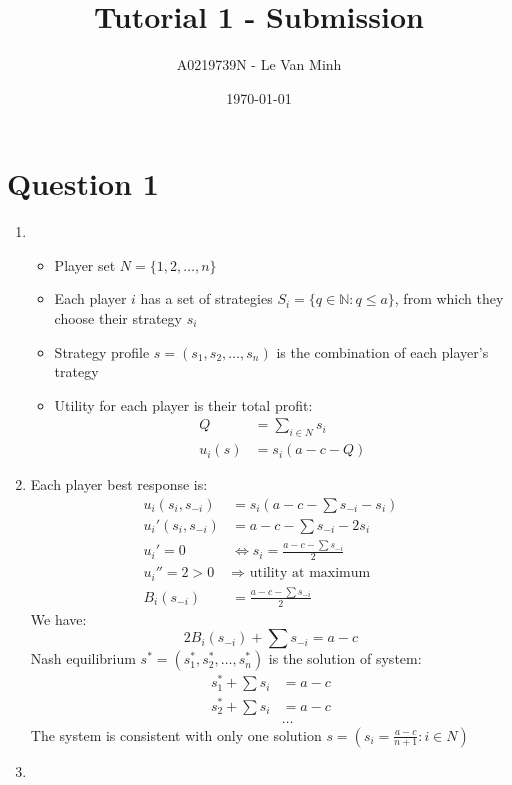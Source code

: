 \documentclass{article}
\title{Tutorial 1 - Submission}
\author{A0219739N - Le Van Minh}
\date{\today}
\begin{document}
\maketitle
\section*{Question 1} 
\begin{enumerate}
  \item \begin{itemize}
    \item Player set $N = \{1, 2, \dots, n\}$
    \item Each player $i$ has a set of strategies $S_i = \{q \in \mathbb{N}: q \le a\}$, from which they choose their strategy $s_i$
    \item Strategy profile $s = (s_1, s_2, \dots, s_n)$ is the combination of each player's trategy
    \item Utility for each player is their total profit:
      \begin{align*}
        Q &= \sum_{i \in N} s_i \\
        u_{i}(s) &= s_i (a - c - Q)
      \end{align*}
  \end{itemize}
  \item Each player best response is:
    \begin{align*}
      u_i(s_i, s_{-i}) &= s_i (a - c - \sum s_{-i} - s_i) \\
      u_i'(s_i, s_{-i}) &= a - c - \sum s_{-i} - 2s_i \\
      u_i' = 0 &\Leftrightarrow s_i = \frac{a - c - \sum s_{-i}}{2} \\
      u_i'' = 2 > 0 &\Rightarrow \text{ utility at maximum} \\
      B_i(s_{-i}) &= \frac{a - c - \sum s_{-i}}{2}
    \end{align*}
    We have: 
    \[
      2B_i(s_{-i}) + \sum s_{-i} = a - c
    \]
    Nash equilibrium $s^* = (s_1^*, s_2^*, \dots, s_n^*)$ is the solution of system:
    \begin{align*}
      s_1^* + \sum s_i &= a - c \\
      s_2^* + \sum s_i &= a - c\\
      &\dots
    \end{align*}
    The system is consistent with only one solution $s = \left(s_i = \frac{a - c}{n + 1}: i \in N\right)$
  \item 
    \begin{align*}

\end{align*}
\end{enumerate}
\end{document}
